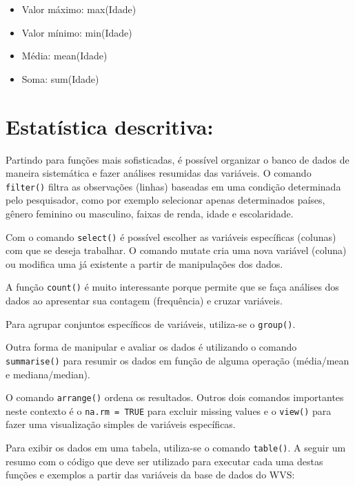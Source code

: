 \documentclass[
  brazil,
]{book}
\providecommand{\tightlist}{%
  \setlength{\itemsep}{0pt}\setlength{\parskip}{0pt}}
\begin{document}
\begin{itemize}
\tightlist
\item
  Valor máximo: max(Idade)
\item
  Valor mínimo: min(Idade)
\item
  Média: mean(Idade)
\item
  Soma: sum(Idade)
\end{itemize}

\hypertarget{estatuxedstica-descritiva}{%
\section{Estatística descritiva:}\label{estatuxedstica-descritiva}}

Partindo para funções mais sofisticadas, é possível organizar o banco de dados de maneira sistemática e fazer análises resumidas das variáveis. O comando \texttt{filter()} filtra as observações (linhas) baseadas em uma condição determinada pelo pesquisador, como por exemplo selecionar apenas determinados países, gênero feminino ou masculino, faixas de renda, idade e escolaridade.

Com o comando \texttt{select()} é possível escolher as variáveis específicas (colunas) com que se deseja trabalhar. O comando mutate cria uma nova variável (coluna) ou modifica uma já existente a partir de manipulações dos dados.

A função \texttt{count()} é muito interessante porque permite que se faça análises dos dados ao apresentar sua contagem (frequência) e cruzar variáveis.

Para agrupar conjuntos específicos de variáveis, utiliza-se o \texttt{group()}.

Outra forma de manipular e avaliar os dados é utilizando o comando \texttt{summarise()} para resumir os dados em função de alguma operação (média/mean e mediana/median).

O comando \texttt{arrange()} ordena os resultados. Outros dois comandos importantes neste contexto é o \texttt{na.rm\ =\ TRUE} para excluir missing values e o \texttt{view()} para fazer uma visualização simples de variáveis específicas.

Para exibir os dados em uma tabela, utiliza-se o comando \texttt{table()}. A seguir um resumo com o código que deve ser utilizado para executar cada uma destas funções e exemplos a partir das variáveis da base de dados do WVS:
\end{document}
